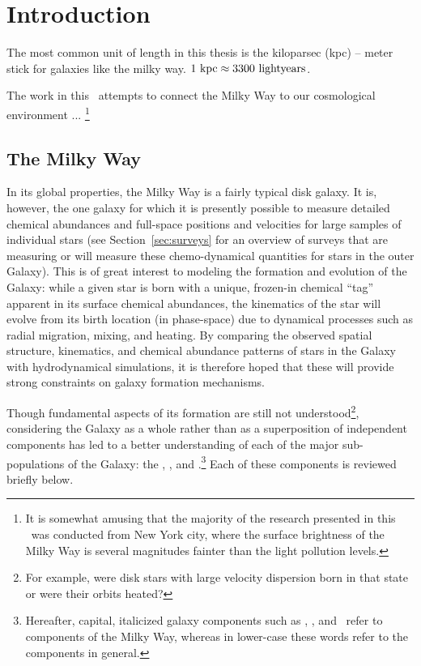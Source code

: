 \chapter[Introduction]{Introduction}
\label{ch:intro}


The most common unit of length in this thesis is the kiloparsec (kpc) -- meter stick for galaxies like the milky way. $1~\mathrm{kpc} \approx 3300~{\rm light years}$.

The work in this \article\ attempts to connect the Milky Way to our cosmological environment ... \footnote{It is somewhat amusing that the majority of the research presented in this \article\ was conducted from New York city, where the surface brightness of the Milky Way is several magnitudes fainter than the light pollution levels.}

\section{The Milky Way}\label{sec:milkyway}

In its global properties, the Milky Way is a fairly typical disk galaxy. It is, however, the one galaxy for which it is presently possible to measure detailed chemical abundances and full-space positions and velocities for large samples of individual stars (see Section~\ref{sec:surveys} for an overview of surveys that are measuring or will measure these chemo-dynamical quantities for stars in the outer Galaxy). This is of great interest to modeling the formation and evolution of the Galaxy: while a given star is born with a unique, frozen-in chemical ``tag'' apparent in its surface chemical abundances, the kinematics of the star will evolve from its birth location (in phase-space) due to dynamical processes such as radial migration, mixing, and heating. By comparing the observed spatial structure, kinematics, and chemical abundance patterns of stars in the Galaxy with hydrodynamical simulations, it is therefore hoped that these will provide strong constraints on galaxy formation mechanisms. 

Though fundamental aspects of its formation are still not understood\footnote{For example, were disk stars with large velocity dispersion born in that state or were their orbits heated?}, considering the Galaxy as a whole rather than as a superposition of independent components has led to a better understanding of each of the major sub-populations of the Galaxy: the \mwdisk, \mwbulge, and \mwhalo.\footnote{Hereafter, capital, italicized galaxy components such as \mwdisk, \mwbulge, and \mwhalo\ refer to components of the Milky Way, whereas in lower-case these words refer to the components in general.} Each of these components is reviewed briefly below.

